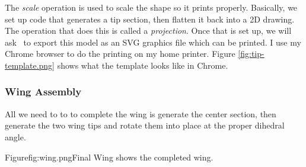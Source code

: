 
The {\it scale} operation is used to scale the shape so it prints properly.
Basically, we set up code that generates a tip section, then flatten it back
into a 2D drawing. The operation that does this is called a {\it projection}.
Once that is set up, we will ask \osc\ to export this model as an SVG graphics
file which can be printed. I use my Chrome browser to do the printing on my
home printer.  Figure \ref{fig:tip-template.png} shows what the template looks
like in Chrome.


\subsubsection{Wing Assembly}

All we need to to to complete the wing is generate the center section, then
generate the two wing tips and rotate them into place at the proper dihedral angle.

Figure{fig:wing.png}{Final Wing} shows the completed wing.




